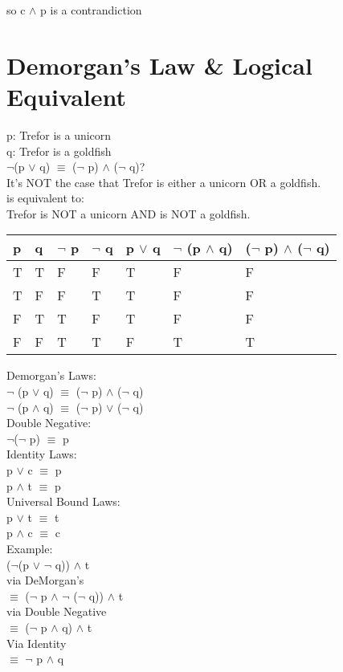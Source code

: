 \documentclass[11pt]{article}
\begin{document}
so c \(\land\) p is a contrandiction\\

\section{Demorgan's Law \& Logical Equivalent}
\label{sec:orgb2cabab}
p: Trefor is a unicorn\\
q: Trefor is a goldfish\\
\(\neg{}\)(p \(\lor\) q) \(\equiv\) (\(\neg{}\) p) \(\land\) (\(\neg{}\) q)?\\
It's NOT the case that Trefor is either a unicorn OR a goldfish.\\
is equivalent to:\\
Trefor is NOT a unicorn AND is NOT a goldfish.\\

\begin{center}
\begin{tabular}{lllllll}
p & q & \(\neg{}\) p & \(\neg{}\) q & p \(\lor\) q & \(\neg{}\) (p \(\land\) q) & (\(\neg{}\) p) \(\land\) (\(\neg{}\) q)\\
\hline
T & T & F & F & T & F & F\\
T & F & F & T & T & F & F\\
F & T & T & F & T & F & F\\
F & F & T & T & F & T & T\\
\end{tabular}
\end{center}

Demorgan's Laws:\\
\(\neg{}\) (p \(\lor\) q) \(\equiv\) (\(\neg{}\) p) \(\land\) (\(\neg{}\) q)\\
\(\neg{}\) (p \(\land\) q) \(\equiv\) (\(\neg{}\) p) \(\lor\) (\(\neg{}\) q)\\

Double Negative:\\
\(\neg{}\)(\(\neg{}\) p) \(\equiv\) p\\

Identity Laws:\\
p \(\lor\) c \(\equiv\) p\\
p \(\land\) t \(\equiv\) p\\

Universal Bound Laws:\\
p \(\lor\) t \(\equiv\) t\\
p \(\land\) c \(\equiv\) c\\

Example:\\
(\(\neg{}\)(p \(\lor\) \(\neg{}\) q)) \(\land\) t\\
via DeMorgan's\\
\(\equiv\) (\(\neg{}\) p \(\land\) \(\neg{}\) (\(\neg{}\) q)) \(\land\) t\\
via Double Negative\\
\(\equiv\) (\(\neg{}\) p \(\land\) q) \(\land\) t\\
Via Identity\\
\(\equiv\) \(\neg{}\) p \(\land\) q\\
\end{document}
